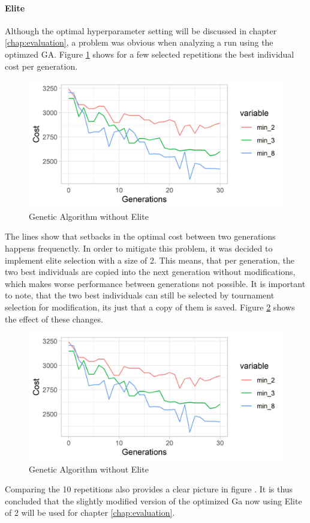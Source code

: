 \paragraph{Elite}
Although the optimal hyperparameter setting will be discussed in chapter \ref{chap:evaluation}, a problem was obvious when analyzing a run using the optimzed GA. Figure \ref{figure:no_elite} shows for a few selected repetitions the best individual cost per generation.

\begin{figure}[ht] 
	\label{figure:no_elite}
	\includegraphics[width=1\linewidth]{simulations/evaluation/plots/ga_no_elite}
	\caption{Genetic Algorithm without Elite}
\end{figure}

The lines show that setbacks in the optimal cost between two generations happens frequenctly. In order to mitigate this problem, it was decided to implement elite selection with a size of 2. This means, that per generation, the two best individuals are copied into the next generation without modifications, which makes worse performance between generations not possible. It is important to note, that the two best individuals can still be selected by tournament selection for modification, its just that a copy of them is saved. Figure \ref{figure:no_with_elite} shows the effect of these changes.

\begin{figure}[ht] 
	\label{figure:no_with_elite}
	\includegraphics[width=1\linewidth]{simulations/evaluation/plots/ga_no_elite}
	\caption{Genetic Algorithm without Elite}
\end{figure}


Comparing the 10 repetitions also provides a clear picture in figure . It is thus concluded that the slightly modified version of the optimized Ga now using Elite of 2 will be used for chapter \ref{chap:evaluation}.




